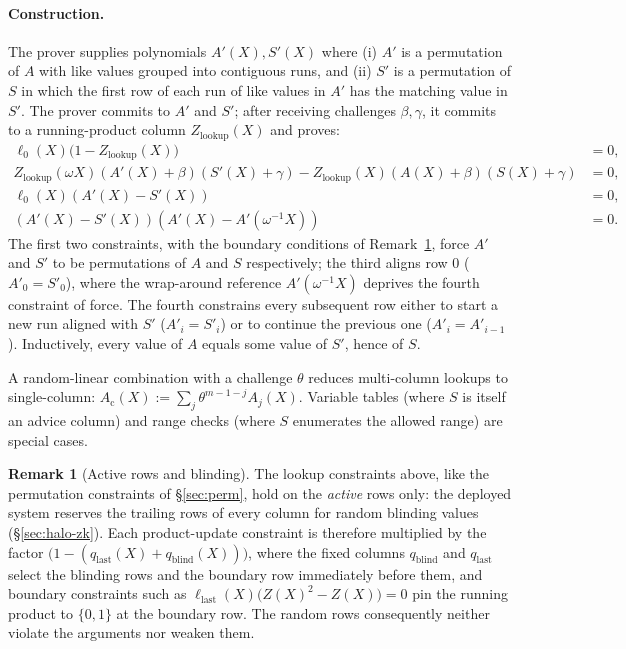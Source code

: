 \documentclass[11pt,a4paper]{article}
\theoremstyle{definition}
\newtheorem{remark}[theorem]{Remark}
\begin{document}
\paragraph{Construction.}
The prover supplies polynomials $A'(X), S'(X)$ where (i) $A'$ is a
permutation of $A$ with like values grouped into contiguous runs, and
(ii) $S'$ is a permutation of $S$ in which the first row of each run of
like values in $A'$ has the matching value in $S'$. The prover commits to
$A'$ and $S'$; after receiving challenges $\beta, \gamma$, it commits to
a running-product column $Z_{\mathrm{lookup}}(X)$ and proves:
\begin{align*}
\ell_0(X) \bigl(1 - Z_{\mathrm{lookup}}(X)\bigr) &= 0,\\
Z_{\mathrm{lookup}}(\omega X)(A'(X) + \beta)(S'(X) + \gamma) - Z_{\mathrm{lookup}}(X)(A(X) + \beta)(S(X) + \gamma) &= 0,\\
\ell_0(X)(A'(X) - S'(X)) &= 0,\\
(A'(X) - S'(X))(A'(X) - A'(\omega^{-1} X)) &= 0.
\end{align*}
The first two constraints, with the boundary conditions of
Remark~\ref{rem:active-rows}, force $A'$ and $S'$ to be permutations of
$A$ and $S$ respectively; the third aligns row $0$ ($A'_0 = S'_0$), where
the wrap-around reference $A'(\omega^{-1}X)$ deprives the fourth
constraint of force. The fourth constrains every subsequent row either to
start a new run aligned with $S'$ ($A'_i = S'_i$) or to continue the
previous one ($A'_i = A'_{i-1}$). Inductively, every value of $A$ equals
some value of $S'$, hence of $S$.

A random-linear combination with a challenge $\theta$ reduces multi-column
lookups to single-column:
$A_{\mathrm{c}}(X) := \sum_j \theta^{m-1-j} A_j(X)$. Variable tables
(where $S$ is itself an advice column) and range checks
(where $S$ enumerates the allowed range) are special cases.

\begin{remark}[Active rows and blinding]\label{rem:active-rows}
The lookup constraints above, like the permutation constraints of
\S\ref{sec:perm}, hold on the \emph{active} rows only: the deployed
system reserves the trailing rows of every column for random blinding
values (\S\ref{sec:halo-zk}). Each product-update constraint is therefore
multiplied by the factor
$\bigl(1 - (q_{\mathrm{last}}(X) + q_{\mathrm{blind}}(X))\bigr)$, where
the fixed columns $q_{\mathrm{blind}}$ and $q_{\mathrm{last}}$ select the
blinding rows and the boundary row immediately before them, and boundary
constraints such as
$\ell_{\mathrm{last}}(X)\bigl(Z(X)^2 - Z(X)\bigr) = 0$ pin the running
product to $\{0, 1\}$ at the boundary row. The random rows consequently
neither violate the arguments nor weaken them.
\end{remark}
\end{document}

